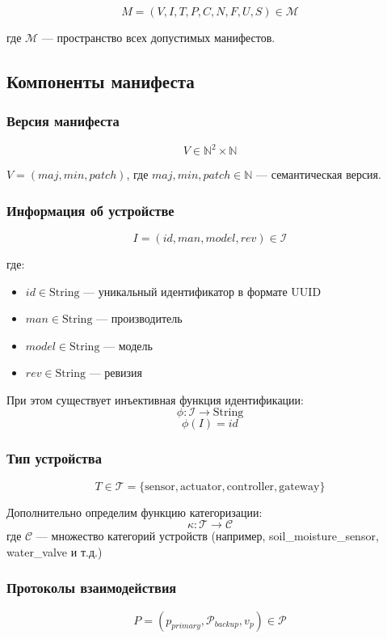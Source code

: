 \documentclass{article}
\begin{document}
\[
M = (V, I, T, P, C, N, F, U, S) \in \mathcal{M}
\]

где $\mathcal{M}$ — пространство всех допустимых манифестов.

\subsection{Компоненты манифеста}

\subsubsection{Версия манифеста}
\[
V \in \mathbb{N}^2 \times \mathbb{N}
\]

$V = (maj, min, patch)$, где $maj, min, patch \in \mathbb{N}$ — семантическая версия.

\subsubsection{Информация об устройстве}
\[
I = (id, man, model, rev) \in \mathcal{I}
\]

где:
\begin{itemize}
    \item $id \in \text{String}$ — уникальный идентификатор в формате UUID
    \item $man \in \text{String}$ — производитель
    \item $model \in \text{String}$ — модель
    \item $rev \in \text{String}$ — ревизия
\end{itemize}

При этом существует инъективная функция идентификации:
\[
\phi: \mathcal{I} \to \text{String}
\]
\[
\phi(I) = id
\]

\subsubsection{Тип устройства}
\[
T \in \mathcal{T} = \{\text{sensor}, \text{actuator}, \text{controller}, \text{gateway}\}
\]

Дополнительно определим функцию категоризации:
\[
\kappa: \mathcal{T} \to \mathcal{C}
\]
где $\mathcal{C}$ — множество категорий устройств (например, soil\_moisture\_sensor, water\_valve и т.д.)

\subsubsection{Протоколы взаимодействия}
\[
P = (p_{primary}, \mathcal{P}_{backup}, v_p) \in \mathcal{P}
\]
\end{document}
